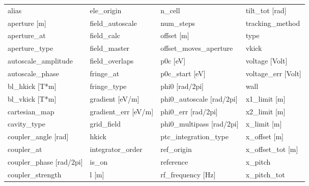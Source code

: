  \begin{tabular}{llll} \toprule
alias                            & ele_origin                       & n_cell                           & tilt_tot [rad]                   \\
aperture [m]                     & field_autoscale                  & num_steps                        & tracking_method                  \\
aperture_at                      & field_calc                       & offset [m]                       & type                             \\
aperture_type                    & field_master                     & offset_moves_aperture            & vkick                            \\
autoscale_amplitude              & field_overlaps                   & p0c [eV]                         & voltage [Volt]                   \\
autoscale_phase                  & fringe_at                        & p0c_start [eV]                   & voltage_err [Volt]               \\
bl_hkick [T*m]                   & fringe_type                      & phi0 [rad/2pi]                   & wall                             \\
bl_vkick [T*m]                   & gradient [eV/m]                  & phi0_autoscale [rad/2pi]         & x1_limit [m]                     \\
cartesian_map                    & gradient_err [eV/m]              & phi0_err [rad/2pi]               & x2_limit [m]                     \\
cavity_type                      & grid_field                       & phi0_multipass [rad/2pi]         & x_limit [m]                      \\
coupler_angle [rad]              & hkick                            & ptc_integration_type             & x_offset [m]                     \\
coupler_at                       & integrator_order                 & ref_origin                       & x_offset_tot [m]                 \\
coupler_phase [rad/2pi]          & is_on                            & reference                        & x_pitch                          \\
coupler_strength                 & l [m]                            & rf_frequency [Hz]                & x_pitch_tot                      \\

\end{tabular}

